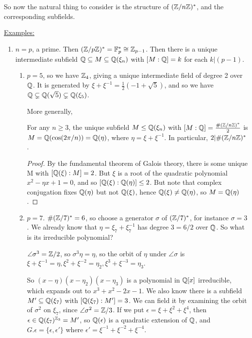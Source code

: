 \documentclass[a4paper, 10pt, twocolumn]{amsart}
\begin{document}
So now the natural thing to consider is the structure of $(\mathbb{Z}/n\mathbb{Z})^{\ast}$, and the corresponding subfields.

\underline{Examples:}
\begin{enumerate}
\item $n=p$, a prime. Then $(\mathbb{Z}/p\mathbb{Z})^{\ast} = \mathbb{F}_p^{\ast} \cong \mathbb{Z}_{p-1}$. Then there is a unique intermediate subfield $\mathbb{Q} \subseteq M \subseteq \mathbb{Q}(\xi_n)$ with $[M:\mathbb{Q}] = k$ for each $k|(p-1)$.
\begin{enumerate}
\item $p=5$, so we have $\mathbb{Z}_4$, giving a unique intermediate field of degree 2 over $\mathbb{Q}$. It is generated by $\xi+\xi^{-1} = \frac{1}{2}(-1+\sqrt{5})$, and so we have $\mathbb{Q} \subsetneq \mathbb{Q}(\sqrt{5})\subsetneq \mathbb{Q}(\xi_5)$.

More generally,
\begin{lemma}
For any $n \geq 3$, the unique subfield $M \leq \mathbb{Q}(\xi_n)$ with $[M:\mathbb{Q}] = \frac{\#(\mathbb{Z}/n\mathbb{Z})^{\ast}}{2}$ is $M = \mathbb{Q}(\cos(2\pi/n)) = \mathbb{Q}(\eta)$, where $\eta  = \xi+\xi^{-1}$. In particular, $2 | \#(\mathbb{Z}/n\mathbb{Z})^{\ast}$.
\end{lemma}
\begin{proof}
By the fundamental theorem of Galois theory, there is some unique M with $[\mathbb{Q}(\xi):M] = 2$. But $\xi$ is a root of the quadratic polynomial $x^2-\eta x+1 = 0$, and so $[\mathbb{Q}(\xi):\mathbb{Q}(\eta)] \leq 2$. But note that complex conjugation fixes $\mathbb{Q}(\eta)$ but not $\mathbb{Q}(\xi)$, hence $\mathbb{Q}(\xi)\neq \mathbb{Q}(\eta)$, so $M = \mathbb{Q}(\eta)$.
\end{proof}
\item $p=7$. $\#(\mathbb{Z}/7)^{\ast} = 6$, so choose a generator $\sigma$ of $(\mathbb{Z}/7)^{\ast}$, for instance $\sigma = 3$. We already know that $\eta = \xi_7+\xi_7^{-1}$ has degree $3=6/2$ over $\mathbb{Q}$. So what is its irreducible polynomial?

$\angle{\sigma^3} = \mathbb{Z}/2$, so $\sigma^3\eta = \eta$, so the orbit of $\eta$ under $\angle{\sigma}$ is $\xi+\xi^{-1} = \eta, \xi^2 + \xi^{-2} = \eta_2, \xi^3+\xi^{-3} = \eta_3$.

So $(x-\eta)(x-\eta_2)(x-\eta_3)$ is a polynomial in $\mathbb{Q}[x]$ irreducible, which expands out to $x^3+x^2-2x-1$. We also know there is a subfield $M'\subseteq \mathbb{Q}(\xi_7)$ with $[\mathbb{Q}(\xi_7):M'] = 3$. We can field it by examining the orbit of $\sigma^2$ on $\xi_7$, since $\angle{\sigma^2} = \mathbb{Z}/3$. If we put $\epsilon = \xi + \xi^2 + \xi^4$, then $\epsilon \in \mathbb{Q}(\xi_7)^{\mathbb{Z}_3} = M'$, so $\mathbb{Q}(\epsilon)$ is a quadratic extension of $\mathbb{Q}$, and $G.\epsilon = \{\epsilon, \epsilon'\}$ where $\epsilon' = \xi^{-1} + \xi^{-2} + \xi^{-4}$.


\end{enumerate}
\end{enumerate}
\end{document}
